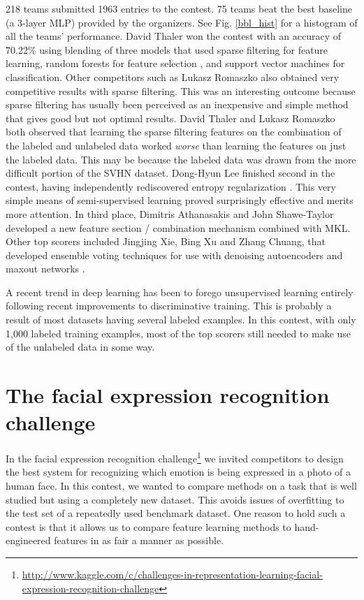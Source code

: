 \documentclass{llncs}
\begin{document}
218 teams submitted 1963 entries to the contest. 75 teams beat the best baseline (a 3-layer MLP) provided by the organizers.
See Fig. \ref{bbl_hist} for a histogram of all the teams' performance.
David Thaler won the contest with an accuracy of 70.22\% using blending of three models that used sparse filtering\citep{Ngiam11} for feature learning,
random forests for feature selection \citep{Breiman01}, and
support vector machines\citep{Cortes95} for classification. Other competitors such as Lukasz Romaszko \citep{Romaszko-wkshp-2013} also obtained
very competitive results with sparse filtering. This was an interesting outcome because sparse filtering has usually been perceived as
an inexpensive and simple method that gives good but not optimal results. David Thaler and Lukasz Romaszko both observed that
learning the sparse filtering features on the combination of the labeled and unlabeled data worked {\em worse} than learning
the features on just the labeled data. This may be because the labeled data was drawn from the more difficult portion of the
SVHN dataset. Dong-Hyun Lee \citep{Lee-wkshp-2013} finished second in the contest, having independently rediscovered entropy regularization
\citep{GrandvaletY2005}.
This very simple means of semi-supervised learning proved surprisingly effective and merits more attention.
In third place, Dimitris Athanasakis and John Shawe-Taylor developed a new feature section / combination mechanism combined with MKL.
Other top scorers included Jingjing Xie, Bing Xu and Zhang Chuang, that developed ensemble voting techniques for use with
denoising autoencoders \citep{VincentPLarochelleH2008-small} and maxout networks \citep{Goodfellow+al-ICML2013-apj}.

A recent trend in deep learning has been to forego unsupervised learning entirely following recent improvements to discriminative training. 
This is probably a result of most datasets having several labeled examples. In this contest, with only 1,000 labeled training
examples, most of the top scorers still needed to make use of the unlabeled data in some way. 

\section{The facial expression recognition challenge}

In the facial expression recognition challenge\footnote{\tiny{\url{http://www.kaggle.com/c/challenges-in-representation-learning-facial-expression-recognition-challenge}}}
we invited competitors to design the best system for recognizing which emotion is being expressed in a photo
of a human face. In this contest, we wanted to compare methods on a task that is well studied but using a completely new dataset.
This avoids issues of overfitting to the test set of a repeatedly used benchmark dataset. One reason to hold such a contest is that
it allows us to compare feature learning methods to hand-engineered features in as fair a manner as possible.
\end{document}
